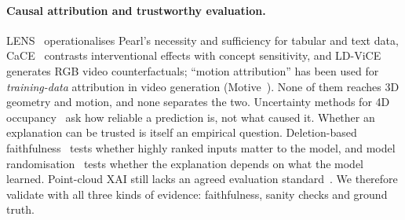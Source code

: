 \paragraph{Causal attribution and trustworthy evaluation.}
LENS~\cite{watson2021lens} operationalises Pearl's necessity and sufficiency for tabular and text data, CaCE~\cite{goyal2019cace} contrasts interventional effects with concept sensitivity, and LD-ViCE~\cite{ldvice2025} generates RGB video counterfactuals; ``motion attribution'' has been used for \emph{training-data} attribution in video generation (Motive~\cite{wu2026motive}). None of them reaches 3D geometry and motion, and none separates the two. Uncertainty methods for 4D occupancy~\cite{reliocc2025,kalble2025evocc,occuq2025} ask how reliable a prediction is, not what caused it. Whether an explanation can be trusted is itself an empirical question. Deletion-based faithfulness~\cite{petsiuk2018rise,deyoung2020eraser} tests whether highly ranked inputs matter to the model, and model randomisation~\cite{adebayo2018sanity} tests whether the explanation depends on what the model learned. Point-cloud XAI still lacks an agreed evaluation standard~\cite{chakraborty2026benchmark}. We therefore validate \method with all three kinds of evidence: faithfulness, sanity checks and ground truth.
